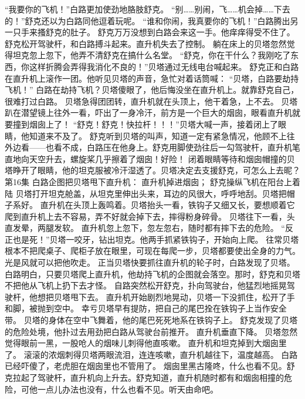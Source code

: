 \documentclass[a4paper,12pt,UTF8,twoside]{ctexbook}
\begin{document}
        “我要你的飞机！”白路更加使劲地胳肢舒克。 
        “别……别闹，飞……机会掉……下去的！”舒克还以为白路同他逗着玩呢。 
        “谁和你闹，我真要你的飞机！”白路腾出另一只手来搔舒克的肚子。 
        舒克万万没想到白路会来这一手。他痒痒得受不住了。舒克松开驾驶杆，和白路搏斗起来。直升机失去了控制。 
        躺在床上的贝塔忽然觉得坦克忽上忽下，他弄不清舒克在搞什么名堂。 
        “舒克，你在干什么？我刚吃了东西，你这样折腾会弄得我消化不良的！”贝塔通过无线电台喊起来。 
        舒克正和白路在直升机上滚作一团。他听见贝塔的声音，急忙对着话筒喊： 
        “贝塔，白路要劫持飞机！” 
        白路在劫持飞机？贝塔傻眼了，他后悔没坐在直升机上。就靠舒克自己，很难打过白路。 
        贝塔急得团团转，直升机就在头顶上，他干着急，上不去。 
        贝塔趴在潜望镜上往外一看，吓出了一身冷汗，前方是一个巨大的烟囱，眼看直升机就要撞到烟囱上了！ 
        “舒克！舒克！快拉杆！！！”贝塔大喊一声，接着闭上了眼睛，他知道来不及了。 
        舒克听到贝塔的叫声，知道一定有紧急情况，他顾不上往外边看——也看不成，白路压在他身上。舒克用脚使劲往后一勾驾驶杆，直升机笔直地向天空升去，螺旋桨几乎擦着了烟囱！好险！ 
        闭着眼睛等待和烟囱帽撞的贝塔睁开了眼睛，他的坦克服被冷汗湿透了。贝塔决定去支援舒克，可怎么上去昵？   第16集   
        白路企图把贝塔甩下直升机： 
        直升机掉进烟囱； 
        舒克操纵飞机在阳台上着陆   
        贝塔打开坦克舱盖，从坦克里伸出头来，耳边的风很大，呼呼地刮。贝塔把帽子系好。 
        直升机在头顶上轰鸣着。贝塔抬头一看，铁钩子又细又长，要想顺着它爬到直升机上去不容易，弄不好就会掉下去，摔得粉身碎骨。 
        贝塔往下一看，头直发晕，两腿发软。 
        直升机忽上忽下，忽左忽右，随时都有摔下去的危险。 
        “反正也是死！”贝塔一咬牙，钻出坦克。他两手抓紧铁钩子，开始向上爬。 
        往常贝塔根本不把爬桌子、爬柜子放在眼里，可现在每爬一步，贝塔都要使出全身的力气。光是风就可以把他吹走。 
        正当贝塔快要抓往直升机的轮子时，白路发现了贝塔。 
        白路明白，只要贝塔爬上直升机，他劫持飞机的企图就会落空。那时，舒克和贝塔不把他从飞机上扔下去才怪。 
        自路突然松开舒克，扑向驾驶台，他猛烈地摇晃驾驶杆，他想把贝塔甩下去。 
        直升机开始剧烈地晃动，贝塔一下没抓住，松开了手和脚，被抛到空中。 
        幸亏贝塔早有提防，把自己的尾巴拴在铁钩子上当作安全带。 
        贝塔的身体在空中飞舞着，他的尾巴死死地系在铁钩子上。 
        舒克发现了贝塔的危险处境，他扑过去用劲把白路从驾驶台前推开。 
        直升机垂直下降。 
        贝塔忽然觉得眼前一黑，一股呛人的烟味儿刺得他直咳嗽。 
        直升机和坦克掉到大烟囱里了。 
        滚滚的浓烟刺得贝塔两眼流泪，连连咳嗽，直升机越往下，温度越高。 
        白路已经吓傻了，老虎胆在烟囱里也不管用了。 
        烟囱里黑古隆咚，什么也看不见。舒克拉起了驾驶杆，直升机向上升去。舒克知道，直升机随时都有和烟囱相撞的危险，可他一点儿办法也没有，什么也看不见。听天由命吧。 
\end{document}
